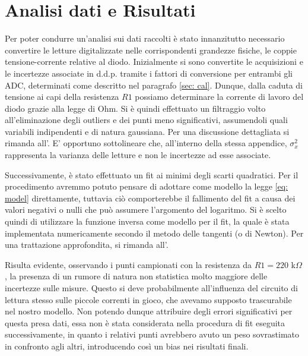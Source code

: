 \documentclass{article}[a4paper, oneside, 11pt]
\begin{document}
\section{Analisi dati e Risultati}
Per poter condurre un'analisi sui dati raccolti è stato innanzitutto
necessario convertire le letture digitalizzate nelle corrispondenti
grandezze fisiche, le coppie tensione-corrente relative al diodo.
Inizialmente si sono convertite le acquisizioni e le incertezze associate in
d.d.p. tramite i fattori di conversione per entrambi gli ADC,
determinati come descritto nel paragrafo \ref{sec: cal}.
Dunque, dalla caduta di tensione ai capi della resistenza $R1$ possiamo
determinare la corrente di lavoro del diodo grazie alla legge di Ohm. 
Si è quindi effettuato un filtraggio volto all'eliminazione degli outliers e 
dei punti meno significativi, assumendoli quali variabili indipendenti e di 
natura gaussiana. Per una discussione dettagliata si rimanda all'. E’ opportuno sottolineare che, all’interno della stessa appendice, 
$\sigma_x^2$ rappresenta la varianza delle letture e non le incertezze ad esse
associate.

Successivamente, è stato effettuato un fit ai minimi degli scarti quadratici.
Per il procedimento avremmo potuto pensare di adottare come modello la legge
\eqref{eq: model} direttamente, tuttavia ciò comporterebbe il fallimento del
fit a causa dei valori negativi o nulli che può assumere l'argomento del
logaritmo. Si è scelto quindi di utilizzare la funzione inversa come modello
per il fit, la quale è stata implementata numericamente secondo il metodo
delle tangenti (o di Newton).
Per una trattazione approfondita, si rimanda all'.

Risulta evidente, osservando i punti campionati con la resistenza da
$R1 = 220$ k$\Omega$, la presenza di un rumore di natura non statistica
molto maggiore delle incertezze sulle misure. 
Questo si deve probabilmente all'influenza del circuito di lettura
stesso sulle piccole correnti in gioco, che avevamo supposto trascurabile
nel nostro modello. Non potendo dunque attribuire degli errori significativi
per questa presa dati, essa non è stata considerata nella procedura di
fit eseguita successivamente, in quanto i relativi punti avrebbero avuto un
peso sovrastimato in confronto agli altri, introducendo così un bias
nei risultati finali.
 
\end{document}
